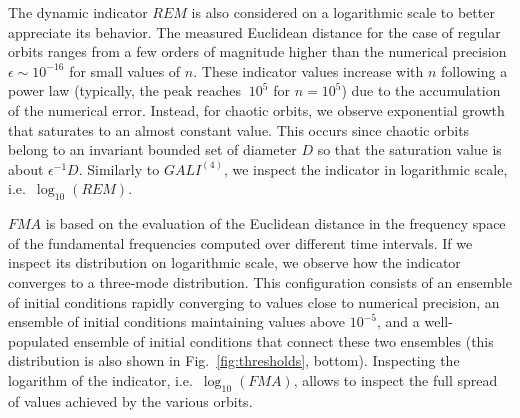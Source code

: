 \begin{chapterappendices}
The dynamic indicator $REM$ is also considered on a logarithmic scale to better appreciate its behavior. The measured Euclidean distance for the case of regular orbits ranges from a few orders of magnitude higher than the numerical precision $\epsilon\sim 10^{-16}$ for small values of $n$. These indicator values increase with $n$ following a power law (typically, the peak reaches $~10^{5}$ for $n=10^5$) due to the accumulation of the numerical error. Instead, for chaotic orbits, we observe exponential growth that saturates to an almost constant value. This occurs since chaotic orbits belong to an invariant bounded set of diameter $D$ so that the saturation value is about $\epsilon^{-1} D$. %
Similarly to $GALI^{(4)}$, we inspect the indicator in logarithmic scale, i.e.~$\log_{10}(REM)$. 

$FMA$ is based on the evaluation of the Euclidean distance in the frequency space of the fundamental frequencies computed over different time intervals. If we inspect its distribution on logarithmic scale, we observe how the indicator converges to a three-mode distribution. This configuration consists of an ensemble of initial conditions rapidly converging to values close to numerical precision, an ensemble of initial conditions maintaining values above $10^{-5}$, and a well-populated ensemble of initial conditions that connect these two ensembles (this distribution is also shown in Fig.~\ref{fig:thresholds}, bottom). Inspecting the logarithm of the indicator, i.e.~$\log_{10}(FMA)$, allows to inspect the full spread of values achieved by the various orbits.

\end{chapterappendices}